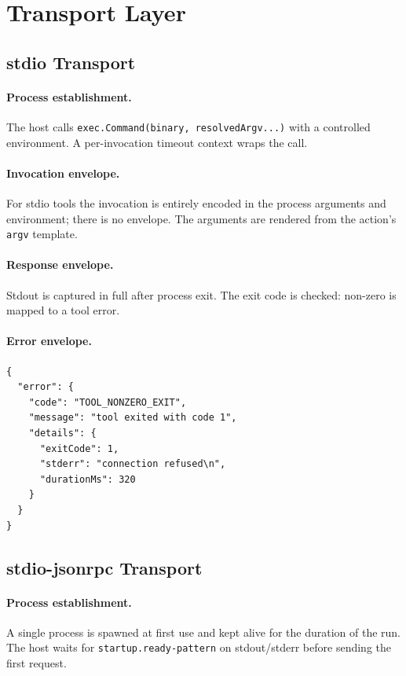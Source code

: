 \section{Transport Layer}
\label{sec:tool-transport}

\subsection{stdio Transport}

\paragraph{Process establishment.}
The host calls \texttt{exec.Command(binary, resolvedArgv...)} with a
controlled environment.  A per-invocation timeout context wraps the call.

\paragraph{Invocation envelope.}
For stdio tools the invocation is entirely encoded in the process arguments
and environment; there is no envelope.  The arguments are rendered from the
action's \texttt{argv} template.

\paragraph{Response envelope.}
Stdout is captured in full after process exit.  The exit code is checked:
non-zero is mapped to a tool error.

\paragraph{Error envelope.}
\begin{verbatim}
{
  "error": {
    "code": "TOOL_NONZERO_EXIT",
    "message": "tool exited with code 1",
    "details": {
      "exitCode": 1,
      "stderr": "connection refused\n",
      "durationMs": 320
    }
  }
}
\end{verbatim}

\subsection{stdio-jsonrpc Transport}

\paragraph{Process establishment.}
A single process is spawned at first use and kept alive for the duration of the
run.  The host waits for \texttt{startup.ready-pattern} on stdout/stderr before
sending the first request.

